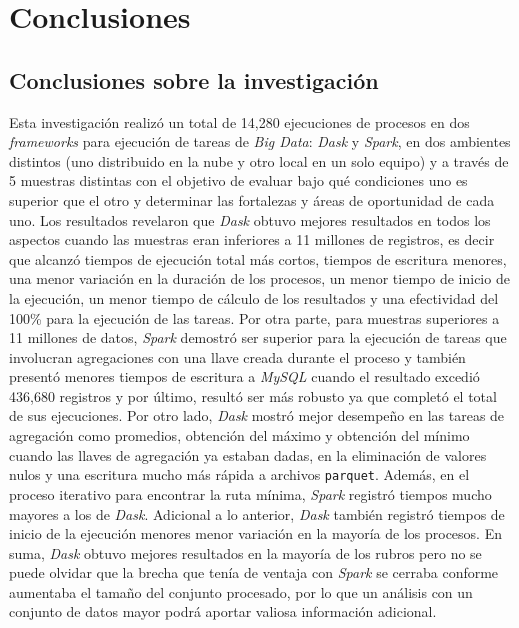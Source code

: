\chapter*{Conclusiones}


\section{Conclusiones sobre la investigación}

Esta investigación realizó un total de 14,280 ejecuciones de procesos en dos \textit{frameworks} para ejecución de tareas de \textit{Big Data}: \textit{Dask} y \textit{Spark}, en dos ambientes distintos (uno distribuido en la nube y otro local en un solo equipo) y a través de 5 muestras distintas con el objetivo de evaluar bajo qué condiciones uno es superior que el otro y determinar las fortalezas y áreas de oportunidad de cada uno. Los resultados revelaron que \textit{Dask} obtuvo mejores resultados en todos los aspectos cuando las muestras eran inferiores a 11 millones de registros, es decir que alcanzó tiempos de ejecución total más cortos, tiempos de escritura menores, una menor variación en la duración de los procesos, un menor tiempo de inicio de la ejecución, un menor tiempo de cálculo de los resultados y una efectividad del 100\% para la ejecución de las tareas. Por otra parte, para muestras superiores a 11 millones de datos, \textit{Spark} demostró ser superior para la ejecución de tareas que involucran agregaciones con una llave creada durante el proceso y también presentó menores tiempos de escritura a \textit{MySQL} cuando el resultado excedió 436,680 registros y por último, resultó ser más robusto ya que completó el total de sus ejecuciones. Por otro lado, \textit{Dask} mostró mejor desempeño en las tareas de agregación como promedios, obtención del máximo y obtención del mínimo cuando las llaves de agregación ya estaban dadas, en la eliminación de valores nulos y una escritura mucho más rápida a archivos \texttt{parquet}. Además, en el proceso iterativo para encontrar la ruta mínima, \textit{Spark} registró tiempos mucho mayores a los de \textit{Dask}. Adicional a lo anterior, \textit{Dask} también registró tiempos de inicio de la ejecución menores menor variación en la mayoría de los procesos.  En suma, \textit{Dask} obtuvo mejores resultados en la mayoría de los rubros pero no se puede olvidar que la brecha que tenía de ventaja con \textit{Spark} se cerraba conforme aumentaba el tamaño del conjunto procesado, por lo que un análisis con un conjunto de datos mayor podrá aportar valiosa información adicional.

